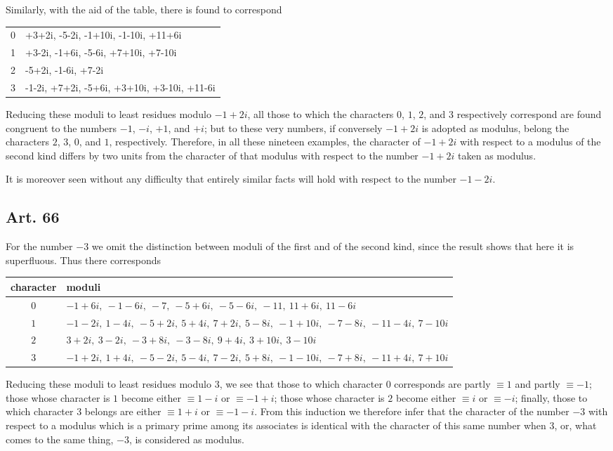 \documentclass[12pt]{article}
\newcommand{\art}[1]{\subsection*{Art. #1}}
\begin{document}
Similarly, with the aid of the table, there is found to correspond

\begin{center}\small
\begin{tabular}{C L}
\toprule
{} & \\
 & +3+2i, -5-2i, -1+10i, -1-10i, +11+6i\\
1 & +3-2i, -1+6i, -5-6i, +7+10i, +7-10i\\
2 & -5+2i, -1-6i, +7-2i\\
3 & -1-2i, +7+2i, -5+6i, +3+10i, +3-10i, +11-6i\\
\bottomrule
\end{tabular}
\end{center}

Reducing these moduli to least residues modulo $-1+2i$, all those to which the characters $0$, $1$, $2$, and $3$ respectively correspond are found congruent to the numbers $-1$, $-i$, $+1$, and $+i$; but to these very numbers, if conversely $-1+2i$ is adopted as modulus, belong the characters $2$, $3$, $0$, and $1$, respectively. Therefore, in all these nineteen examples, the character of $-1+2i$ with respect to a modulus of the second kind differs by two units from the character of that modulus with respect to the number $-1+2i$ taken as modulus.

It is moreover seen without any difficulty that entirely similar facts will hold with respect to the number $-1-2i$.

\art{66}
For the number $-3$ we omit the distinction between moduli of the first and of the second kind, since the result shows that here it is superfluous. Thus there corresponds
\begin{center}\small
\begin{tabular}{c p{5.4in}}
\toprule
character & moduli\\
\midrule
$0$ & $-1+6i,\ -1-6i,\ -7,\ -5+6i,\ -5-6i,\ -11,\ 11+6i,\ 11-6i$\\
$1$ & $-1-2i,\ 1-4i,\ -5+2i,\ 5+4i,\ 7+2i,\ 5-8i,\ -1+10i,\ -7-8i,\ -11-4i,\ 7-10i$\\
$2$ & $3+2i,\ 3-2i,\ -3+8i,\ -3-8i,\ 9+4i,\ 3+10i,\ 3-10i$\\
$3$ & $-1+2i,\ 1+4i,\ -5-2i,\ 5-4i,\ 7-2i,\ 5+8i,\ -1-10i,\ -7+8i,\ -11+4i,\ 7+10i$\\
\bottomrule
\end{tabular}
\end{center}

Reducing these moduli to least residues modulo $3$, we see that those to which character $0$ corresponds are partly $\equiv1$ and partly $\equiv-1$; those whose character is $1$ become either $\equiv1-i$ or $\equiv-1+i$; those whose character is $2$ become either $\equiv i$ or $\equiv-i$; finally, those to which character $3$ belongs are either $\equiv1+i$ or $\equiv-1-i$. From this induction we therefore infer that the character of the number $-3$ with respect to a modulus which is a primary prime among its associates is identical with the character of this same number when $3$, or, what comes to the same thing, $-3$, is considered as modulus.
\end{document}
